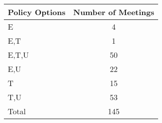\begin{tabular}{lc}
\hline\hline 
Policy Options & Number of Meetings \\ 
\hline 
E & 4 \\
E,T & 1 \\
E,T,U & 50 \\
E,U & 22 \\
T & 15 \\
T,U & 53 \\
\addlinespace 
Total & 145 \\
\hline 
\end{tabular}